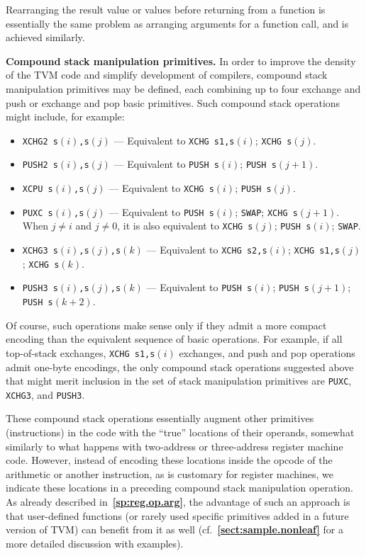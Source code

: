 \documentclass[12pt,oneside]{article}
\def\makepoint#1{\medbreak\noindent{\bf #1.\ }}
\def\nxsubpoint{\refstepcounter{subsubsection}%
  \smallbreak\makepoint{\thesubsubsection}}
\def\refpoint#1{{\rm\textbf{\ref{#1}}}}
\let\ptref=\refpoint
\def\emb#1{\textbf{#1.}}
\begin{document}
Rearranging the result value or values before returning from a function is essentially the same problem as arranging arguments for a function call, and is achieved similarly.

\nxsubpoint\label{sp:stack.comp}\emb{Compound stack manipulation primitives}
In order to improve the density of the TVM code and simplify development of compilers, compound stack manipulation primitives may be defined, each combining up to four exchange and push or exchange and pop basic primitives. Such compound stack operations might include, for example:
\begin{itemize}
\item \texttt{XCHG2 s$(i)$,s$(j)$} --- Equivalent to \texttt{XCHG s1,s$(i)$}; \texttt{XCHG s$(j)$}.
\item \texttt{PUSH2 s$(i)$,s$(j)$} --- Equivalent to \texttt{PUSH s$(i)$}; \texttt{PUSH s$(j+1)$}.
\item \texttt{XCPU s$(i)$,s$(j)$} --- Equivalent to \texttt{XCHG s$(i)$}; \texttt{PUSH s$(j)$}.
\item \texttt{PUXC s$(i)$,s$(j)$} --- Equivalent to \texttt{PUSH s$(i)$}; \texttt{SWAP}; \texttt{XCHG s$(j+1)$}. When $j\neq i$ and $j\neq0$, it is also equivalent to \texttt{XCHG s$(j)$}; \texttt{PUSH s$(i)$}; \texttt{SWAP}.
\item \texttt{XCHG3 s$(i)$,s$(j)$,s$(k)$} --- Equivalent to \texttt{XCHG s2,s$(i)$}; \texttt{XCHG s1,s$(j)$}; \texttt{XCHG s$(k)$}.
\item \texttt{PUSH3 s$(i)$,s$(j)$,s$(k)$} --- Equivalent to \texttt{PUSH s$(i)$}; \texttt{PUSH s$(j+1)$}; \texttt{PUSH s$(k+2)$}.
\end{itemize}
Of course, such operations make sense only if they admit a more compact encoding than the equivalent sequence of basic operations. For example, if all top-of-stack exchanges, \texttt{XCHG s1,s$(i)$} exchanges, and push and pop operations admit one-byte encodings, the only compound stack operations suggested above that might merit inclusion in the set of stack manipulation primitives are \texttt{PUXC}, \texttt{XCHG3}, and \texttt{PUSH3}.

These compound stack operations essentially augment other primitives (instructions) in the code with the ``true'' locations of their operands, somewhat similarly to what happens with two-address or three-address register machine code. However, instead of encoding these locations inside the opcode of the arithmetic or another instruction, as is customary for register machines, we indicate these locations in a preceding compound stack manipulation operation. As already described in~\ptref{sp:reg.op.arg}, the advantage of such an approach is that user-defined functions (or rarely used specific primitives added in a future version of TVM) can benefit from it as well (cf.~\ptref{sect:sample.nonleaf} for a more detailed discussion with examples).
\end{document}
